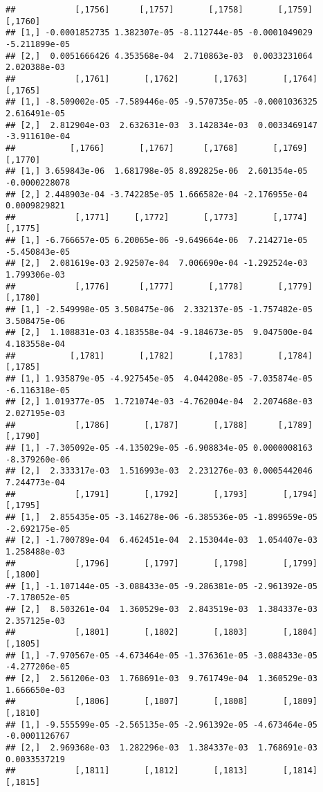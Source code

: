 \documentclass[
]{article}
\begin{document}
\begin{verbatim}
##            [,1756]      [,1757]       [,1758]       [,1759]       [,1760]
## [1,] -0.0001852735 1.382307e-05 -8.112744e-05 -0.0001049029 -5.211899e-05
## [2,]  0.0051666426 4.353568e-04  2.710863e-03  0.0033231064  2.020388e-03
##            [,1761]       [,1762]       [,1763]       [,1764]       [,1765]
## [1,] -8.509002e-05 -7.589446e-05 -9.570735e-05 -0.0001036325  2.616491e-05
## [2,]  2.812904e-03  2.632631e-03  3.142834e-03  0.0033469147 -3.911610e-04
##           [,1766]       [,1767]      [,1768]       [,1769]       [,1770]
## [1,] 3.659843e-06  1.681798e-05 8.892825e-06  2.601354e-05 -0.0000228078
## [2,] 2.448903e-04 -3.742285e-05 1.666582e-04 -2.176955e-04  0.0009829821
##            [,1771]     [,1772]       [,1773]       [,1774]       [,1775]
## [1,] -6.766657e-05 6.20065e-06 -9.649664e-06  7.214271e-05 -5.450843e-05
## [2,]  2.081619e-03 2.92507e-04  7.006690e-04 -1.292524e-03  1.799306e-03
##            [,1776]      [,1777]       [,1778]       [,1779]      [,1780]
## [1,] -2.549998e-05 3.508475e-06  2.332137e-05 -1.757482e-05 3.508475e-06
## [2,]  1.108831e-03 4.183558e-04 -9.184673e-05  9.047500e-04 4.183558e-04
##           [,1781]       [,1782]       [,1783]       [,1784]       [,1785]
## [1,] 1.935879e-05 -4.927545e-05  4.044208e-05 -7.035874e-05 -6.116318e-05
## [2,] 1.019377e-05  1.721074e-03 -4.762004e-04  2.207468e-03  2.027195e-03
##            [,1786]       [,1787]       [,1788]      [,1789]       [,1790]
## [1,] -7.305092e-05 -4.135029e-05 -6.908834e-05 0.0000008163 -8.379260e-06
## [2,]  2.333317e-03  1.516993e-03  2.231276e-03 0.0005442046  7.244773e-04
##            [,1791]       [,1792]       [,1793]       [,1794]       [,1795]
## [1,]  2.855435e-05 -3.146278e-06 -6.385536e-05 -1.899659e-05 -2.692175e-05
## [2,] -1.700789e-04  6.462451e-04  2.153044e-03  1.054407e-03  1.258488e-03
##            [,1796]       [,1797]       [,1798]       [,1799]       [,1800]
## [1,] -1.107144e-05 -3.088433e-05 -9.286381e-05 -2.961392e-05 -7.178052e-05
## [2,]  8.503261e-04  1.360529e-03  2.843519e-03  1.384337e-03  2.357125e-03
##            [,1801]       [,1802]       [,1803]       [,1804]       [,1805]
## [1,] -7.970567e-05 -4.673464e-05 -1.376361e-05 -3.088433e-05 -4.277206e-05
## [2,]  2.561206e-03  1.768691e-03  9.761749e-04  1.360529e-03  1.666650e-03
##            [,1806]       [,1807]       [,1808]       [,1809]       [,1810]
## [1,] -9.555599e-05 -2.565135e-05 -2.961392e-05 -4.673464e-05 -0.0001126767
## [2,]  2.969368e-03  1.282296e-03  1.384337e-03  1.768691e-03  0.0033537219
##            [,1811]       [,1812]       [,1813]       [,1814]       [,1815]

\end{verbatim}
\end{document}
